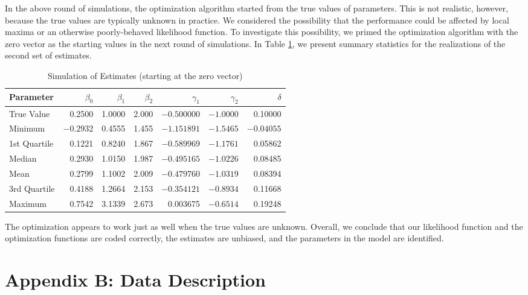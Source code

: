 \documentclass[11pt]{paper}
\begin{document}
In the above round of simulations, the optimization algorithm started from 
the true values of parameters.  
This is not realistic, however, because the true values are typically unknown 
in practice.  
We considered the possibility that the performance could be affected by local 
maxima or an otherwise poorly-behaved likelihood function. 
To investigate this possibility, we primed the optimization algorithm with the 
zero vector as the starting values in the next round of simulations.
In Table \ref{tab:sim_cold}, we present summary statistics for the 
realizations of the second set of estimates. 
% 
\begin{table}[ht]
\centering
\begin{tabular}{l r r r r r r}
  \hline
	Parameter 	& $\beta_0$	& $\beta_1$	& $\beta_2$	& $\gamma_1$	& $\gamma_2$	& $\delta$ \\ 
  \hline
	True Value 	&  0.2500 		&   1.0000 	&   2.000 		& $-0.500000$		&  $-1.0000$		&   0.10000  \\
  \hline
 	Minimum		& $-0.2932$	&   0.4555 	&   1.455 		&  $-1.151891$		&  $-1.5465$ 		& $-0.04055$ \\
 	1st Quartile	&   0.1221 	&   0.8240 	&   1.867 		&  $-0.589969$		&  $-1.1761$ 		&   0.05862  \\
 	Median 		&   0.2930 	&   1.0150 	&   1.987 		&  $-0.495165$		&  $-1.0226$ 		&   0.08485  \\
 	Mean   		&   0.2799 	&   1.1002 	&   2.009 		&  $-0.479760$		&  $-1.0319$ 		&   0.08394  \\
 	3rd Quartile	&   0.4188 	&   1.2664 	&   2.153 		&   $-0.354121$	&  $-0.8934$ 		&   0.11668  \\
 	Maximum   	&   0.7542 	&   3.1339 	&   2.673 		&    0.003675 		&  $-0.6514$ 		&   0.19248  \\
   \hline
\end{tabular}
\caption{Simulation of Estimates (starting at the zero vector)} 
\label{tab:sim_cold}
\end{table}
% 
The optimization appears to work just as well when the true values are unknown. 
Overall, we conclude that our likelihood function 
and the optimization functions are coded correctly, 
the estimates are unbiased, 
and the parameters in the model are identified. 


\section*{Appendix B: Data Description}
\end{document}

